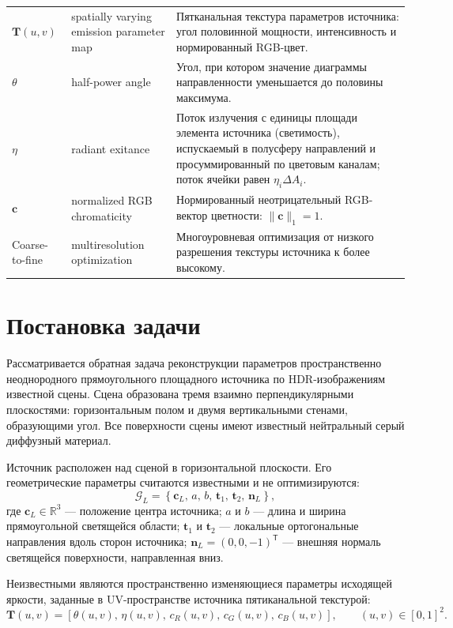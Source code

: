 {\begin{xltabular}{\textwidth}{>{\raggedright\arraybackslash}p{0.23\textwidth} >{\raggedright\arraybackslash}p{0.19\textwidth} >{\raggedright\arraybackslash}X}
$\mathbf{T}(u,v)$ & spatially varying emission parameter map & Пятканальная текстура параметров источника: угол половинной мощности, интенсивность и нормированный RGB-цвет. \\

$\theta$ & half-power angle & Угол, при котором значение диаграммы направленности уменьшается до половины максимума. \\

$\eta$ & radiant exitance & Поток излучения с единицы площади элемента источника (светимость), испускаемый в полусферу направлений и просуммированный по цветовым каналам; поток ячейки равен $\eta_i\Delta A_i$. \\

$\mathbf{c}$ & normalized RGB chromaticity & Нормированный неотрицательный RGB-вектор цветности: $\|\mathbf{c}\|_1=1$. \\

Coarse-to-fine & multiresolution optimization & Многоуровневая оптимизация от низкого разрешения текстуры источника к более высокому. \\
\end{xltabular}}

\section{Постановка задачи}

Рассматривается обратная задача реконструкции параметров пространственно неоднородного прямоугольного площадного источника по HDR-изображениям известной сцены. Сцена образована тремя взаимно перпендикулярными плоскостями: горизонтальным полом и двумя вертикальными стенами, образующими угол. Все поверхности сцены имеют известный нейтральный серый диффузный материал.

Источник расположен над сценой в горизонтальной плоскости. Его геометрические параметры считаются известными и не оптимизируются:
\begin{equation}
\mathcal{G}_L=
\left\{
\mathbf{c}_L,\,
a,\,
b,\,
\mathbf{t}_1,\,
\mathbf{t}_2,\,
\mathbf{n}_L
\right\},
\end{equation}
где $\mathbf{c}_L\in\mathbb{R}^3$ --- положение центра источника; $a$ и $b$ --- длина и ширина прямоугольной светящейся области; $\mathbf{t}_1$ и $\mathbf{t}_2$ --- локальные ортогональные направления вдоль сторон источника; $\mathbf{n}_L=(0,0,-1)^\mathsf{T}$ --- внешняя нормаль светящейся поверхности, направленная вниз.

Неизвестными являются пространственно изменяющиеся параметры исходящей яркости, заданные в UV-пространстве источника пятиканальной текстурой:
\begin{equation}
\mathbf{T}(u,v)=
\left[
\theta(u,v),\,
\eta(u,v),\,
c_R(u,v),\,
c_G(u,v),\,
c_B(u,v)
\right],
\qquad
(u,v)\in[0,1]^2.
\end{equation}


